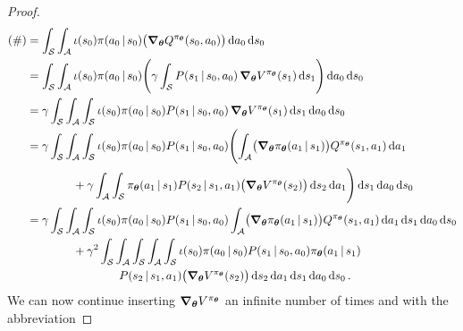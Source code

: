 \begin{proof}
			\begin{align}
				(\#)
				 & = \int_\mathcal{S} \int_\mathcal{A} \iota(s_0) \pi(a_0 \,\vert\, s_0) \bigl( \grad_{\bm{\theta}} Q^{\pi_{\bm{\theta}}}(s_0, a_0) \bigr) \dd{a_0} \dd{s_0}                                                                                                                      \\
				 & = \int_\mathcal{S} \int_\mathcal{A} \iota(s_0) \pi(a_0 \,\vert\, s_0) \Biggl( \gamma \int_\mathcal{S} P(s_1 \,\vert\, s_0, a_0) \, \grad_{\bm{\theta}} V^{\pi_{\bm{\theta}}}(s_1) \dd{s_1} \Biggr) \dd{a_0} \dd{s_0}                                                              \\
				 & = \gamma \int_\mathcal{S} \int_\mathcal{A} \int_\mathcal{S} \iota(s_0) \pi(a_0 \,\vert\, s_0) P(s_1 \,\vert\, s_0, a_0) \, \grad_{\bm{\theta}} V^{\pi_{\bm{\theta}}}(s_1) \dd{s_1} \dd{a_0} \dd{s_0}  \label{eq:pgtStep}                                                          \\
				 & = \gamma \int_\mathcal{S} \int_\mathcal{A} \int_\mathcal{S} \iota(s_0) \pi(a_0 \,\vert\, s_0) P(s_1 \,\vert\, s_0, a_0) \Biggl( \int_\mathcal{A} \bigl( \grad_{\bm{\theta}} \pi_{\bm{\theta}}(a_1 \,\vert\, s_1) \bigr) Q^{\pi_{\bm{\theta}}}(s_1, a_1) \dd{a_1}                    \\&\qquad\qquad
				+ \gamma \int_\mathcal{A} \int_\mathcal{S} \pi_{\bm{\theta}}(a_1 \,\vert\, s_1) P(s_2 \,\vert\, s_1, a_1) \bigl( \grad_{\bm{\theta}} V^{\pi_{\bm{\theta}}}(s_2) \bigr) \dd{s_2} \dd{a_1} \Biggr) \dd{s_1} \dd{a_0} \dd{s_0}                                                         \\
				 & = \gamma \int_\mathcal{S} \int_\mathcal{A} \int_\mathcal{S} \iota(s_0) \pi(a_0 \,\vert\, s_0) P(s_1 \,\vert\, s_0, a_0) \int_\mathcal{A} \bigl( \grad_{\bm{\theta}} \pi_{\bm{\theta}}(a_1 \,\vert\, s_1) \bigr) Q^{\pi_{\bm{\theta}}}(s_1, a_1) \dd{a_1} \dd{s_1} \dd{a_0} \dd{s_0} \\&\qquad\qquad
				+ \gamma^2 \int_\mathcal{S} \int_\mathcal{A} \int_\mathcal{S} \int_\mathcal{A} \int_\mathcal{S} \iota(s_0) \pi(a_0 \,\vert\, s_0) P(s_1 \,\vert\, s_0, a_0) \pi_{\bm{\theta}}(a_1 \,\vert\, s_1)                                                                                         \\&\qquad\qquad\qquad\qquad
				P(s_2 \,\vert\, s_1, a_1) \bigl( \grad_{\bm{\theta}} V^{\pi_{\bm{\theta}}}(s_2) \bigr) \dd{s_2} \dd{a_1} \dd{s_1} \dd{a_0} \dd{s_0}.
			\end{align}
			We can now continue inserting \( \grad_{\bm{\theta}} V^{\pi_{\bm{\theta}}} \) an infinite number of times and with the abbreviation

\end{proof}
